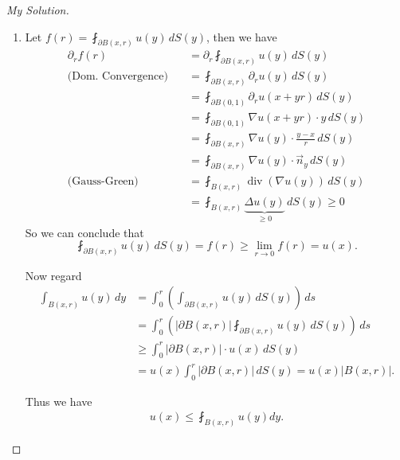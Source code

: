 \documentclass{report}
\theoremstyle{tommy}
\renewcommand\div{\operatorname{div}}
\begin{document}
  \begin{proof}[My Solution]
    \begin{enumerate}[label=\alph*)]
      \item Let \(f(r) = \fint_{\partial B(x, r)} u(y) \, dS(y)\), then we have
        \begin{align*}
          \partial_r f(r)
          &= \partial_r \fint_{\partial B(x,r)} u(y) \, dS(y) \\
          \text{(Dom. Convergence)} \quad &= \fint_{\partial B(x, r)} \partial_r u(y) \, dS(y) \\
          &= \fint_{\partial B(0,1)} \partial_r u(x+yr) \, dS(y) \\
          &= \fint_{\partial B(0,1)} \nabla u(x+yr) \cdot y \, dS(y) \\
          &= \fint_{\partial B(x, r)} \nabla u(y) \cdot \frac{y-x}{r} \, dS(y) \\
          &= \fint_{\partial B(x,r)} \nabla u(y) \cdot \vec{n}_y \, dS(y) \\
          \text{(Gauss-Green)} \quad &= \fint_{B(x, r)} \div(\nabla u(y)) \, dS(y) \\
          &= \fint_{B(x,r)} \underbrace{\Delta u(y)}_{\ge 0} \, dS(y) \ge 0
        \end{align*}
        So we can conclude that
        \[\fint_{\partial B(x, r)} u(y) \, dS(y) = f(r) \ge \lim_{r \to 0} f(r) = u(x).\]

        Now regard
        \begin{align*}
          \int_{B(x,r)} u(y) \, dy 
          &= \int_0^r \left(\int_{\partial B(x, r)} u(y) \, dS(y)\right) \, ds \\
          &= \int_0^r \left(|\partial B(x, r)| \fint_{\partial B(x,r)} u(y) \, dS(y)\right) \, ds \\
          &\ge \int_0^r |\partial B(x, r)| \cdot  u(x) \, dS(y) \\
          &= u(x) \int_0^r |\partial B(x, r)| \, dS(y)
          = u(x) |B(x,r)|.
        \end{align*}

        Thus we have
        \begin{align*}
          u(x) \le \fint_{B(x,r)} u(y) dy.
        \end{align*}


\end{enumerate}
\end{proof}
\end{document}

